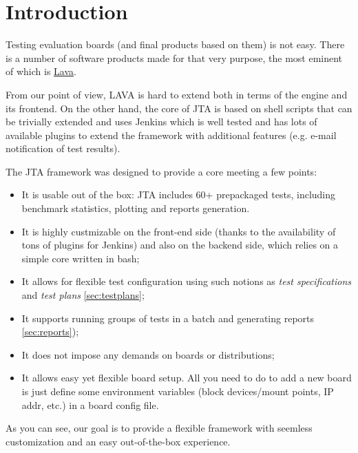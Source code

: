 \section{Introduction}
\label{sec:intro}

Testing evaluation boards (and final products based on them) is not easy. There is a number of software products made for that very purpose, the most eminent of which is \href{https://wiki.linaro.org/Platform/LAVA}{Lava}.

From our point of view, LAVA is hard to extend both in terms of the engine and its frontend. On the other hand, the core of JTA is based on shell scripts that can be trivially extended and uses Jenkins which is well tested and has lots of available plugins to extend the framework with additional features (e.g. e-mail notification of test results).

The JTA framework was designed to provide a core meeting a few points:

\begin{itemize}
\item It is usable out of the box: JTA includes 60+ prepackaged tests, including benchmark statistics, plotting and reports generation.
\item It is highly custmizable on the front-end side (thanks to the availability of tons of plugins for Jenkins) and also on the backend side, which relies on a simple core written in bash;
\item It allows for flexible test configuration using such notions as \textit{test specifications} and \textit{test plans} \ref{sec:testplans};
\item It supports running groups of tests in a batch and generating reports \ref{sec:reports});
\item It does not impose any demands on boards or distributions;
\item It allows easy yet flexible board setup. All you need to do to add a new board is just define some environment variables (block devices/mount points, IP addr, etc.) in a board config file.
\end{itemize}

As you can see, our goal is to provide a flexible framework with seemless customization and an easy out-of-the-box experience.


